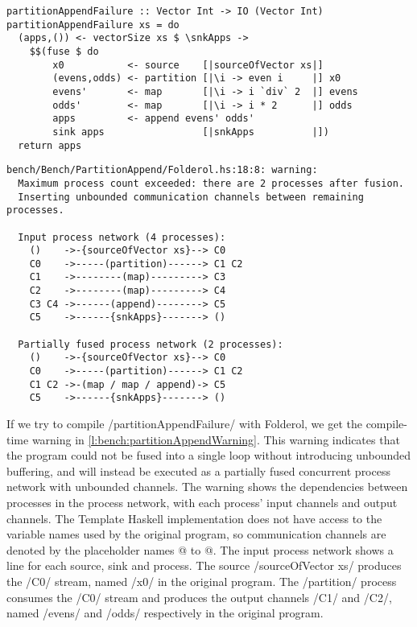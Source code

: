 \begin{lstlisting}[float,label=l:bench:partitionAppendFail,caption=Partition / append fusion failure]
partitionAppendFailure :: Vector Int -> IO (Vector Int)
partitionAppendFailure xs = do
  (apps,()) <- vectorSize xs $ \snkApps ->
    $$(fuse $ do
        x0           <- source    [|sourceOfVector xs|]
        (evens,odds) <- partition [|\i -> even i     |] x0
        evens'       <- map       [|\i -> i `div` 2  |] evens
        odds'        <- map       [|\i -> i * 2      |] odds
        apps         <- append evens' odds'
        sink apps                 [|snkApps          |])
  return apps
\end{lstlisting}


\begin{lstlisting}[float,language=nil,label=l:bench:partitionAppendWarning,caption=Partition / append fusion failure compile-time warning]
bench/Bench/PartitionAppend/Folderol.hs:18:8: warning:
  Maximum process count exceeded: there are 2 processes after fusion.
  Inserting unbounded communication channels between remaining processes.

  Input process network (4 processes):
    ()    ->-{sourceOfVector xs}--> C0
    C0    ->-----(partition)------> C1 C2
    C1    ->--------(map)---------> C3
    C2    ->--------(map)---------> C4
    C3 C4 ->------(append)--------> C5
    C5    ->------{snkApps}-------> ()
  
  Partially fused process network (2 processes):
    ()    ->-{sourceOfVector xs}--> C0
    C0    ->-----(partition)------> C1 C2
    C1 C2 ->-(map / map / append)-> C5
    C5    ->------{snkApps}-------> ()
\end{lstlisting}

If we try to compile \Hs/partitionAppendFailure/ with Folderol, we get the compile-time warning in \cref{l:bench:partitionAppendWarning}.
This warning indicates that the program could not be fused into a single loop without introducing unbounded buffering, and will instead be executed as a partially fused concurrent process network with unbounded channels.
The warning shows the dependencies between processes in the process network, with each process' input channels and output channels.
The Template Haskell implementation does not have access to the variable names used by the original program, so communication channels are denoted by the placeholder names @ to @.
The input process network shows a line for each source, sink and process.
The source \Hs/{sourceOfVector xs}/ produces the \Hs/C0/ stream, named \Hs/x0/ in the original program.
The \Hs/partition/ process consumes the \Hs/C0/ stream and produces the output channels \Hs/C1/ and \Hs/C2/, named \Hs/evens/ and \Hs/odds/ respectively in the original program.

